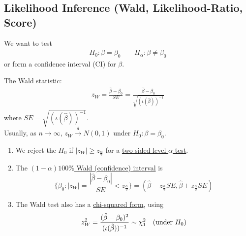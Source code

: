 \documentclass[11pt]{elegantbook}
\begin{document}
\subsection{Likelihood Inference (Wald, Likelihood-Ratio, Score)}
We want to test
\begin{equation}
    \begin{aligned}
        H_0:\beta=\beta_0\quad\quad H_\alpha:\beta\neq \beta_0
    \end{aligned}
    \nonumber
\end{equation}
or form a confidence interval (CI) for $\beta$.

\begin{definition}
    The Wald statistic:
    \begin{equation}
        \begin{aligned}
            z_W=\frac{\hat{\beta}-\beta_0}{SE}=\frac{\hat{\beta}-\beta_0}{\sqrt{(\iota(\hat{\beta}))^{-1}}}
        \end{aligned}
        \nonumber
    \end{equation}
    where $\textit{SE}=\sqrt{(\iota(\hat{\beta}))^{-1}}$.\\
    Usually, as $n \rightarrow \infty$, $z_W \stackrel{d}{\longrightarrow} N(0,1)$ under $H_0:\beta=\beta_0$.
    \begin{enumerate}[(1)]
        \item We reject the $H_0$ if $|z_W|\geq z_{\frac{\alpha}{2}}$ for a \underline{two-sided level $\alpha$ test}.
        \item The \underline{$(1-\alpha)100\%$ Wald (confidence) interval} is $$\{\beta_0:|z_W|=\frac{|\hat{\beta}-\beta_0|}{SE}<z_{\frac{\alpha}{2}}\}=(\hat{\beta}-z_\frac{\alpha}{2}SE,\hat{\beta}+z_\frac{\alpha}{2}SE)$$
        \item The Wald test also has a \underline{chi-squared form}, using
        \begin{equation}
            \begin{aligned}
                z_W^2=\frac{(\hat{\beta}-\beta_0)^2}{(\iota(\hat{\beta}))^{-1}}\sim \chi_1^2\quad \textnormal{(under $H_0$)}
            \end{aligned}
            \nonumber
        \end{equation}
    \end{enumerate}
\end{definition}
\end{document}

